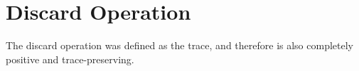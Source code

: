 

\section{Discard Operation} \label{sec:discarding}

The discard operation was defined as the trace, and therefore is also completely positive and trace-preserving.



